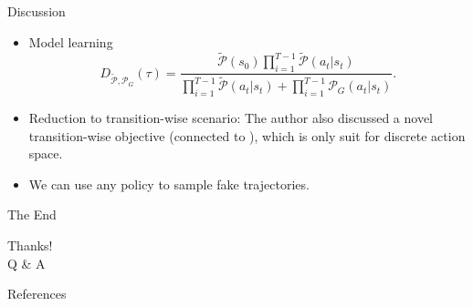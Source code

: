 \documentclass[10pt,aspectratio=169]{beamer}
\begin{document}
\begin{frame}{Discussion}
	\begin{itemize}
		\item Model learning
		\[
			D_{\tilde{\mathcal{P}}, \mathcal{P}_G}(\tau) = \frac{\tilde{\mathcal{P}}(s_0)\prod_{i=1}^{T-1}\tilde{\mathcal{P}}(a_t|s_t)}{\prod_{i=1}^{T-1}\tilde{\mathcal{P}}(a_t|s_t) + \prod_{i=1}^{T-1}\mathcal{P}_G(a_t|s_t)}.
		\]
		\item Reduction to transition-wise scenario: The author also discussed a novel transition-wise objective (connected to \citep{DBLP:journals/corr/abs-1710-11248}), which is only suit for discrete action space.
		\item We can use any policy to sample fake trajectories.
	\end{itemize}
\end{frame}

\begin{frame}{The End}
    \begin{center}
        {\huge Thanks!} \\
        \vspace{0.3cm}
        {\huge Q \& A}
    \end{center}
\end{frame}

\begin{frame}{References}
	
	
\end{frame}
\end{document}

